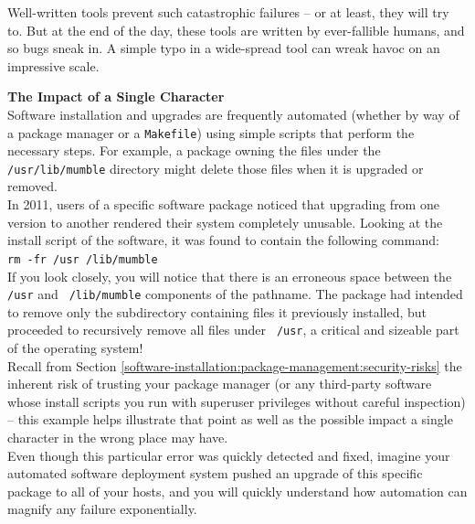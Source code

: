 Well-written tools prevent such catastrophic failures
-- or at least, they will try to.  But at the end of
the day, these tools are written by ever-fallible
humans, and so bugs sneak in.  A simple typo in a
wide-spread tool can wreak havoc on an impressive
scale.

\begin{sidenote}
{\bf The Impact of a Single Character} \\

Software installation and upgrades are frequently
automated (whether by way of a package manager or a
{\tt Makefile}) using simple scripts that perform the
necessary steps.  For example, a package owning the
files under the {\tt /usr/lib/mumble} directory might
delete those files when it is upgraded or removed. \\
[10pt]

In 2011, users of a specific software package noticed
that upgrading from one version to another rendered
their system completely unusable.  Looking at the
install script of the software, it was found to
contain the following command: \\ [10pt]

\verb+rm -fr /usr /lib/mumble+ \\ [10pt]

If you look closely, you will notice that there is an
erroneous space between the {\tt /usr} and {\tt
/lib/mumble} components of the pathname.  The package
had intended to remove only the subdirectory
containing files it previously installed, but
proceeded to recursively remove all files under {\tt
/usr}, a critical and sizeable part of the operating
system! \\ [10pt]

Recall from Section
\ref{software-installation:package-management:security-risks}
the inherent risk of trusting your package manager (or
any third-party software whose install scripts you run
with superuser privileges without careful inspection)
-- this example helps illustrate that point as well as
the possible impact a single character in the wrong
place may have. \\ [10pt]

Even though this particular error was quickly detected
and fixed, imagine your automated software deployment
system pushed an upgrade of this specific package to
all of your hosts, and you will quickly understand how
automation can magnify any failure exponentially.
\end{sidenote}

